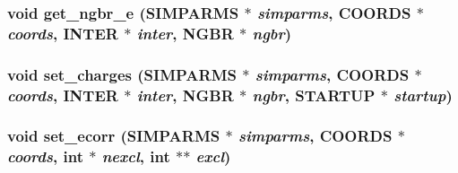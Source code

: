 \subsubsection{\setlength{\rightskip}{0pt plus 5cm}void get\_\-ngbr\_\-e ({\bf SIMPARMS} $\ast$ {\em simparms}, {\bf COORDS} $\ast$ {\em coords}, {\bf INTER} $\ast$ {\em inter}, {\bf NGBR} $\ast$ {\em ngbr})}\label{elec__ngbr_8c_e19a02adb55a4a08cee0ce46ae4d5b1b}


\subsubsection{\setlength{\rightskip}{0pt plus 5cm}void set\_\-charges ({\bf SIMPARMS} $\ast$ {\em simparms}, {\bf COORDS} $\ast$ {\em coords}, {\bf INTER} $\ast$ {\em inter}, {\bf NGBR} $\ast$ {\em ngbr}, {\bf STARTUP} $\ast$ {\em startup})}\label{elec__ngbr_8c_3ed58e2e0a6889bc51b6daf2d2e1cc0b}


\subsubsection{\setlength{\rightskip}{0pt plus 5cm}void set\_\-ecorr ({\bf SIMPARMS} $\ast$ {\em simparms}, {\bf COORDS} $\ast$ {\em coords}, int $\ast$ {\em nexcl}, int $\ast$$\ast$ {\em excl})}\label{elec__ngbr_8c_e3b38adf3e1f4150d5143ddae8c6e26d}



